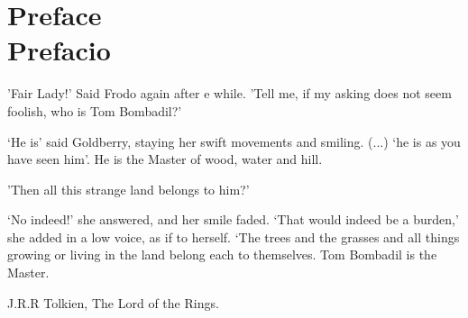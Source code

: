 \chapter*{Preface\\ Prefacio}
\epigraph{'Fair Lady!' Said Frodo again after e while. 'Tell me, if my asking does not seem foolish, who is Tom Bombadil?'

`He is' said Goldberry, staying her swift movements and smiling. (...) `he is as you have seen him'. He is the Master of wood, water and hill.

'Then all this strange land belongs to him?'

`No indeed!' she answered, and her smile faded. `That would indeed be a burden,' she added in a low voice, as if to herself. `The trees and the grasses and all things growing or living in the land belong each to themselves. Tom Bombadil is the Master.}{J.R.R Tolkien, The Lord of the Rings.}
